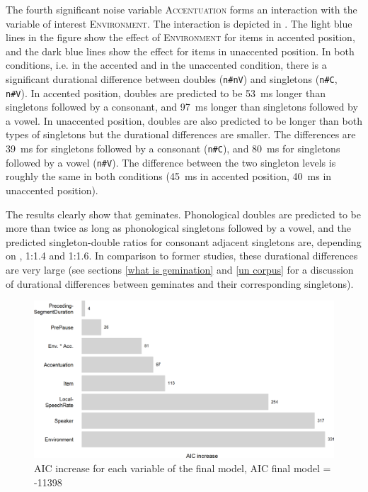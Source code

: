 The fourth significant noise variable \textsc{Accentuation} forms an interaction with the variable of interest \textsc{Environment}. The interaction is depicted in .
The light blue lines in the figure show the effect of \textsc{Environment} for items in accented position, and the dark blue lines show the effect for items in unaccented position. In both conditions, i.e. in the accented and in the unaccented condition, there is a significant durational difference between doubles (\texttt{n\#nV}) and singletons (\texttt{n\#C}, \texttt{n\#V}). 
 In accented position, doubles are predicted to be 53~ms longer than singletons followed by a consonant, and 97~ms longer than singletons followed by a vowel. 
 In unaccented position, doubles are also predicted to be longer than both types of singletons but the durational differences are smaller. The differences are 39~ms  for singletons followed by a consonant (\texttt{n\#C}), and 80~ms for singletons followed by a vowel (\texttt{n\#V}). The difference between the two singleton levels is roughly the same in both conditions (45~ms in accented position, 40~ms in unaccented position).




 The results clearly show that  geminates. Phonological doubles are predicted to be more than twice as long as phonological singletons followed by a vowel, and the predicted singleton-double ratios for consonant adjacent singletons are, depending on , 1:1.4 and 1:1.6. In comparison to former studies, these durational differences are very large (see sections \ref{what is gemination} and \ref{un corpus} for a discussion of durational differences between geminates and their corresponding singletons). 




\begin{figure}
	
	
	\includegraphics[scale=0.7] {images/Experiment/AICdecreaseUnComplex.png}


	\caption{AIC increase for each variable of the final model, AIC final model = -11398}
	\label{fig:Effect sozed un Exp unV vs Unn}

\end{figure}



